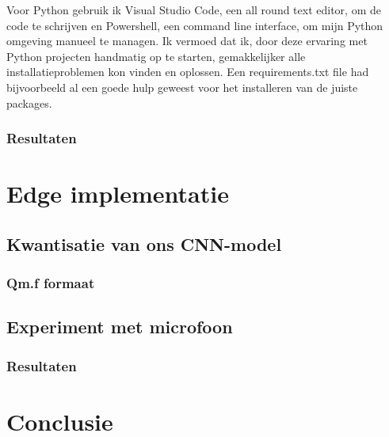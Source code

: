 Voor Python gebruik ik Visual Studio Code, een all round text editor, om de code te schrijven en Powershell, een command line interface, om mijn Python omgeving manueel te managen. Ik vermoed dat ik, door deze ervaring met Python projecten handmatig op te starten, gemakkelijker alle installatieproblemen kon vinden en oplossen.
Een requirements.txt file \cite{pip-user-guide} had bijvoorbeeld al een goede hulp geweest voor het installeren van de juiste packages.

\subsubsection{Resultaten}



\section{Edge implementatie}

\subsection{Kwantisatie van ons CNN-model}
\subsubsection{Qm.f formaat}
\label{section:Qm.f}

\subsection{Experiment met microfoon}
\subsubsection{Resultaten}


\section{Conclusie}